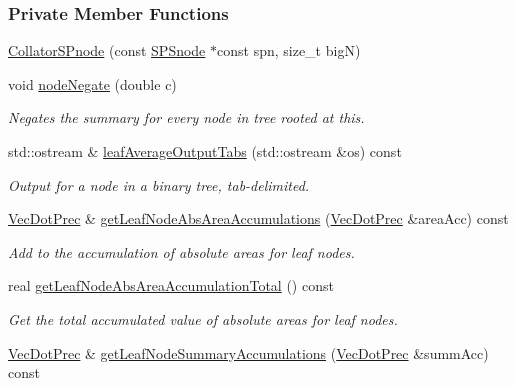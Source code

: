 \subsubsection*{\-Private \-Member \-Functions}
\begin{DoxyCompactItemize}
\item 
\hyperlink{classsubpavings_1_1CollatorSPnode_aa14e448dca22fa7c14de4d21c0624b26}{\-Collator\-S\-Pnode} (const \hyperlink{classsubpavings_1_1SPSnode}{\-S\-P\-Snode} $\ast$const spn, size\-\_\-t big\-N)
\item 
void \hyperlink{classsubpavings_1_1CollatorSPnode_a3ba268993642c1fd5c702966a4fd4fba}{node\-Negate} (double c)
\begin{DoxyCompactList}\small\item\em \-Negates the summary for every node in tree rooted at this. \end{DoxyCompactList}\item 
std\-::ostream \& \hyperlink{classsubpavings_1_1CollatorSPnode_a9fe7256f1a62884e4bb8599a63abbbdf}{leaf\-Average\-Output\-Tabs} (std\-::ostream \&os) const 
\begin{DoxyCompactList}\small\item\em \-Output for a node in a binary tree, tab-\/delimited. \end{DoxyCompactList}\item 
\hyperlink{namespacesubpavings_ad8f0a077ee1c4678bcd1868f3aecd605}{\-Vec\-Dot\-Prec} \& \hyperlink{classsubpavings_1_1CollatorSPnode_a5ac89a38985d8ff62ca7a29943c6734c}{get\-Leaf\-Node\-Abs\-Area\-Accumulations} (\hyperlink{namespacesubpavings_ad8f0a077ee1c4678bcd1868f3aecd605}{\-Vec\-Dot\-Prec} \&area\-Acc) const 
\begin{DoxyCompactList}\small\item\em \-Add to the accumulation of absolute areas for leaf nodes. \end{DoxyCompactList}\item 
real \hyperlink{classsubpavings_1_1CollatorSPnode_a0afe525dbddf958078e9a8eac6ea88a3}{get\-Leaf\-Node\-Abs\-Area\-Accumulation\-Total} () const 
\begin{DoxyCompactList}\small\item\em \-Get the total accumulated value of absolute areas for leaf nodes. \end{DoxyCompactList}\item 
\hyperlink{namespacesubpavings_ad8f0a077ee1c4678bcd1868f3aecd605}{\-Vec\-Dot\-Prec} \& \hyperlink{classsubpavings_1_1CollatorSPnode_a7daf828f08626b5b83654550e5a98bee}{get\-Leaf\-Node\-Summary\-Accumulations} (\hyperlink{namespacesubpavings_ad8f0a077ee1c4678bcd1868f3aecd605}{\-Vec\-Dot\-Prec} \&summ\-Acc) const 

\end{DoxyCompactItemize}
